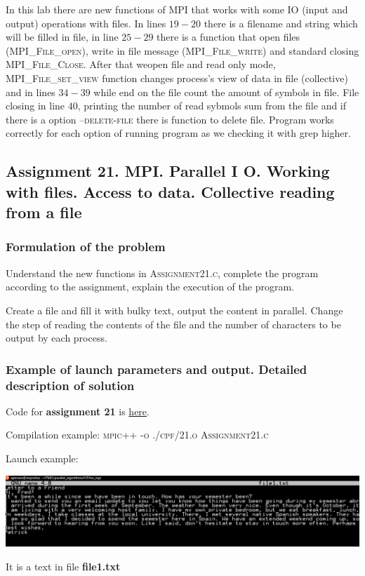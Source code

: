 \documentclass[%
12pt, %
final, %
oneside, %
onecolumn, %
centertags]{article} %
\theoremstyle{plain}
\theoremstyle{definition}
\theoremstyle{remark}
\begin{document}
In this lab there are new functions of MPI that works with some I\/O (input and output) operations with files. In lines $19-20$ there is a filename and string which will be filled in file, in line $25-29$ there is a function that open files (\textsc{MPI\_File\_open}), write in file message (\textsc{MPI\_File\_write}) and standard closing \textsc{MPI\_File\_Close}. After that weopen file and read only mode, \textsc{MPI\_File\_set\_view} function changes process’s view of data in file (collective) and in lines $34-39$ while end on the file count the amount of symbols in file. File closing in line $40$, printing the number of read sybmols sum from the file and if there is a option \textsc{--delete-file} there is function to delete file. Program works correctly 
for each option of running program as we checking it with grep higher. 

\newpage

\subsection{Assignment 21. MPI. Parallel I \/ O. Working with files. Access to data. Collective reading from a file}

\subsubsection{Formulation of the problem}

Understand the new functions in \textsc{Assignment21.c}, complete the program according 
to the assignment, explain the execution of the program.

Create a file and fill it with bulky text, output the content in parallel. Change the step 
of reading the contents of the file and the number of characters to be output by each 
process.

\subsubsection{Example of launch parameters and output. Detailed description of solution}

Code for \textbf{assignment 21} is \href{https:\//github.com/aptmess/parallel_algorithms/blob/master/HT/hw_mpi/Assignment21.c}{here}.

Compilation example: \textsc{mpic++ -o ./cpf/21.o Assignment21.c}

Launch example: 

\begin{center}
\includegraphics[scale=0.45]{21.content.png}

It is a text in file \textbf{file1.txt}
\end{center}
\end{document}
